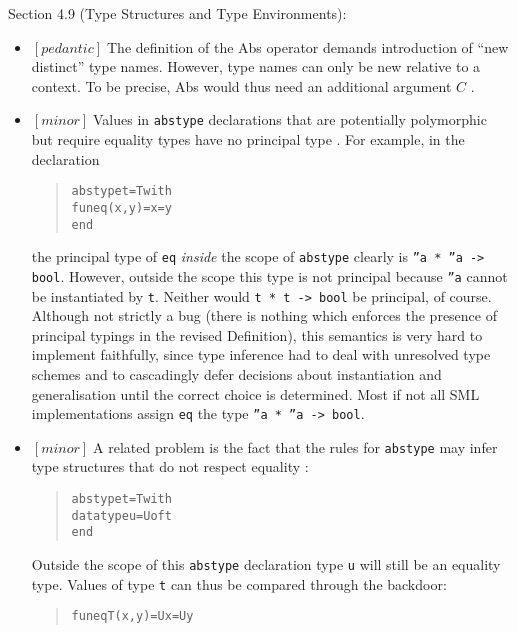 \documentclass{article}
\newcommand{\m}[1]{$[\mathit{#1}]\;$}
\newcommand{\minor}{\m{minor}}
\newcommand{\pedantic}{\m{pedantic}}
\begin{document}
Section 4.9 (Type Structures and Type Environments):
\nopagebreak

\begin{itemize}
\item \pedantic The definition of the Abs operator demands introduction of ``new distinct'' type names. However, type names can only be new relative to a context. To be precise, Abs would thus need an additional argument $C$ \cite{addenda}.

\item \minor Values in {\tt abstype} declarations that are potentially polymorphic but require equality types have no principal type \cite{addenda}. For example, in the declaration
\begin{quote}
\begin{alltt}
abstype t = T with
    fun eq(x,y) = x = y
end
\end{alltt}
\end{quote}
the principal type of {\tt eq} {\em inside} the scope of {\tt abstype} clearly is {\tt ''a * ''a -> bool}. However, outside the scope this type is not principal because {\tt ''a} cannot be instantiated by {\tt t}. Neither would {\tt t * t -> bool} be principal, of course. Although not strictly a bug (there is nothing which enforces the presence of principal typings in the revised Definition), this semantics is very hard to implement faithfully, since type inference had to deal with unresolved type schemes and to cascadingly defer decisions about instantiation and generalisation until the correct choice is determined. Most if not all SML implementations assign {\tt eq} the type {\tt ''a * ''a -> bool}.

\item \minor A related problem is the fact that the rules for {\tt abstype} may infer type structures that do not respect equality \cite{addenda}:
\begin{quote}
\begin{alltt}
abstype t = T with
    datatype u = U of t
end
\end{alltt}
\end{quote}
Outside the scope of this {\tt abstype} declaration type {\tt u} will still be an equality type. Values of type {\tt t} can thus be compared through the backdoor:
\begin{quote}
\begin{alltt}
fun eqT(x,y) = U x = U y
\end{alltt}
\end{quote}
\end{itemize}
\end{document}
